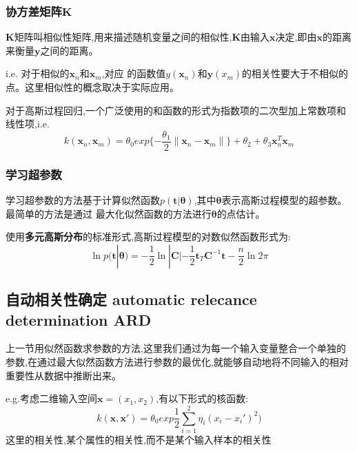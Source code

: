 \documentclass[UTF8,a4paper]{ctexart}
\begin{document}
            \subsubsection{协方差矩阵$\bm K$}
            $\bm K$矩阵叫相似性矩阵,用来描述随机变量之间的相似性,$\bm K$由输入$\bm x$决定,即由$\bm x$的距离来衡量$\bm y$之间的距离。

            i.e. 对于相似的$\bm x_n$和$\bm x_m$,对应 的函数值$y(\bm x_n)$和$\bm y(x_m)$的相关性要大于不相似的点。这里相似性的概念取决于实际应用。

            对于高斯过程回归,一个广泛使用的和函数的形式为指数项的二次型加上常数项和线性项,i.e.
            \begin{equation}
                k(\bm x_n,\bm x_m) = \theta_0 exp\{-\frac{\theta_1}{2}\| \bm x_n - \bm x_m \|\} + \theta_2 + \theta_3\bm x_n^T \bm x_m
            \end{equation}

            \subsubsection{学习超参数}
            学习超参数的方法基于计算似然函数$p(\bm t|\bm \theta)$,其中$\bm \theta$表示高斯过程模型的超参数。最简单的方法是通过
            最大化似然函数的方法进行$\bm \theta$的点估计。

            使用\textbf{多元高斯分布}的标准形式,高斯过程模型的对数似然函数形式为:
            \begin{equation}
                \ln p(\bm t|\bm \theta) = -\frac{1}{2}\ln|\bm C| - \frac{1}{2}\bm t_T\bm C^{-1}\bm t - \frac{n}{2}\ln 2\pi
            \end{equation}

        \subsection{自动相关性确定 automatic relecance determination ARD}
        上一节用似然函数求参数的方法,这里我们通过为每一个输入变量整合一个单独的参数,在通过最大似然函数方法进行参数的最优化,就能够自动地将不同输入的相对重要性从数据中推断出来。

        e.g.考虑二维输入空间$\bm x = (x_1,x_2)$,有以下形式的核函数:
        \begin{equation}
            k(\bm x , \bm x') = \theta_0 exp{\frac{1}{2}\sum_{i = 1}^2\eta_i(x_i - x_i')^2})
        \end{equation}
        {\color{blue}这里的相关性,某个属性的相关性,而不是某个输入样本的相关性}
\end{document}
